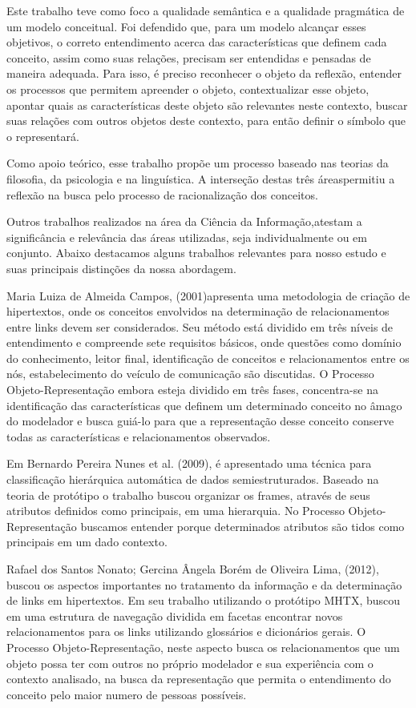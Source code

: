Este trabalho teve como foco a qualidade semântica e a qualidade pragmática de um modelo conceitual. Foi defendido que, para um modelo alcançar esses objetivos, o correto entendimento acerca das características que definem cada conceito, assim como suas relações, precisam ser entendidas e pensadas de maneira adequada. Para isso, é preciso reconhecer o objeto da reflexão, entender os processos que permitem apreender o objeto, contextualizar esse objeto, apontar quais as características deste objeto são relevantes neste contexto, buscar suas relações com outros objetos deste contexto, para então definir o símbolo que o representará.

Como apoio teórico, esse trabalho propõe um processo baseado nas teorias da filosofia, da psicologia e na linguística. A interseção destas três áreaspermitiu a reflexão na busca pelo processo de racionalização dos conceitos.

Outros trabalhos realizados na área da Ciência da Informação,atestam a significância e relevância das áreas utilizadas, seja individualmente ou em conjunto. Abaixo destacamos alguns trabalhos relevantes para nosso estudo e suas principais distinções da nossa abordagem.

Maria Luiza de Almeida Campos, (2001)apresenta uma metodologia de criação de hipertextos, onde os conceitos envolvidos na determinação de relacionamentos entre links devem ser considerados. Seu método está dividido em três níveis de entendimento e compreende sete requisitos básicos, onde questões como domínio do conhecimento, leitor final, identificação de conceitos e relacionamentos entre os nós, estabelecimento do veículo de comunicação são discutidas. O Processo Objeto-Representação embora esteja dividido em três fases, concentra-se na identificação das características que definem um determinado conceito no âmago do modelador e busca guiá-lo para que a representação desse conceito conserve todas as características e relacionamentos observados.

Em Bernardo Pereira Nunes et al. (2009), é apresentado uma técnica para classificação hierárquica automática de dados semiestruturados. Baseado na teoria de protótipo o trabalho buscou organizar os frames, através de seus atributos definidos como principais, em uma hierarquia. No Processo Objeto-Representação buscamos entender porque determinados atributos são tidos como principais em um dado contexto.

Rafael dos Santos Nonato; Gercina Ângela Borém de Oliveira Lima, (2012), buscou os aspectos importantes no tratamento da informação e da determinação de links em hipertextos. Em seu trabalho utilizando o protótipo MHTX, buscou em uma estrutura de navegação dividida em facetas encontrar novos relacionamentos para os links utilizando glossários e dicionários gerais. O Processo Objeto-Representação, neste aspecto busca os relacionamentos que um objeto possa ter com outros no próprio modelador e sua experiência com o contexto analisado, na busca da representação que permita o entendimento do conceito pelo maior numero de pessoas possíveis.


